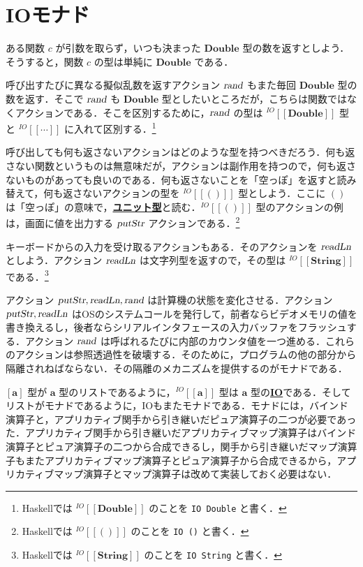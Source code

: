 \documentclass[a4paper,twocolumn]{jsbook}
\def\[{\left[\!\left[}
\def\]{\right]\!\right]}
\newcommand{\programminglanguage}[1]{\textsf{#1}}
\newcommand{\haskell}{\programminglanguage{Haskell}}
\newcommand{\keyword}[1]{{\underline{\textbf{#1}}}}
\newcommand{\code}[1]{\texttt{#1}}
\newcommand{\mAction}[1]{\textsl{#1}}
\DeclareMathOperator{\mReadLn}{\mAction{readLn}}
\DeclareMathOperator{\mPutStr}{\mAction{putStr}}
\DeclareMathOperator{\mRand}{\mAction{rand}}
\newcommand{\mType}[1]{\mathbf{#1}}
\newcommand{\mDoubleType}{\mType{Double}}
\newcommand{\mStringType}{\mType{String}}
\newcommand{\mUnitType}{\mType{()}}
\newcommand{\mListType}[1]{[\mType{#1}]}
\newcommand{\mIODoubleType}{\mIOType{\mDoubleType}}
\newcommand{\mIOStringType}{\mIOType{\mStringType}}
\newcommand{\mIOUnitType}{\mIOType{\mUnitType}}
\newcommand{\mTypeConstructor}[1]{\textit{#1}}
\newcommand{\mGenericTypeAssemble}[2]{{}^{\mTypeConstructor{#1}}\[\mType{#2}\]}
\newcommand{\mIOType}[1]{\mGenericTypeAssemble{IO}{#1}}
\begin{document}
\section{IOモナド}

ある関数 $c$ が引数を取らず，いつも決まった $\mDoubleType$ 型の数を返すとしよう．そうすると，関数 $c$ の型は単純に $\mDoubleType$ である．

呼び出すたびに異なる擬似乱数を返すアクション $\mRand$ もまた毎回 $\mDoubleType$ 型の数を返す．そこで $\mRand$ も $\mDoubleType$ 型としたいところだが，こちらは関数ではなくアクションである．そこを区別するために，$\mRand$ の型は $\mIODoubleType$ 型と $\mIOType{\dotsb}$ に入れて区別する．\footnote{\haskell では $\mIODoubleType$ のことを \code{IO Double} と書く．}

呼び出しても何も返さないアクションはどのような型を持つべきだろう．何も返さない関数というものは無意味だが，アクションは副作用を持つので，何も返さないものがあっても良いのである．何も返さないことを「空っぽ」を返すと読み替えて，何も返さないアクションの型を $\mIOUnitType$ 型としよう．ここに $\mUnitType$ は「空っぽ」の意味で，\keyword{ユニット型}と読む．$\mIOUnitType$ 型のアクションの例は，画面に値を出力する $\mPutStr$ アクションである．\footnote{\haskell では $\mIOUnitType$ のことを \code{IO ()} と書く．}

キーボードからの入力を受け取るアクションもある．そのアクションを $\mReadLn$ としよう．アクション $\mReadLn$ は文字列型を返すので，その型は $\mIOStringType$ である．\footnote{\haskell では $\mIOStringType$ のことを \code{IO String} と書く．}

アクション $\mPutStr,\mReadLn,\mRand$ は計算機の状態を変化させる．アクション $\mPutStr,\mReadLn$ はOSのシステムコールを発行して，前者ならビデオメモリの値を書き換えるし，後者ならシリアルインタフェースの入力バッファをフラッシュする．アクション $\mRand$ は呼ばれるたびに内部のカウンタ値を一つ進める．これらのアクションは参照透過性を破壊する．そのために，プログラムの他の部分から隔離されねばならない．その隔離のメカニズムを提供するのがモナドである．

$\mListType{a}$ 型が $\mType{a}$ 型のリストであるように，$\mIOType{a}$ 型は $\mType{a}$ 型の\keyword{IO}である．そしてリストがモナドであるように，IOもまたモナドである．モナドには，バインド演算子と，アプリカティブ関手から引き継いだピュア演算子の二つが必要であった．アプリカティブ関手から引き継いだアプリカティブマップ演算子はバインド演算子とピュア演算子の二つから合成できるし，関手から引き継いだマップ演算子もまたアプリカティブマップ演算子とピュア演算子から合成できるから，アプリカティブマップ演算子とマップ演算子は改めて実装しておく必要はない．
\end{document}

